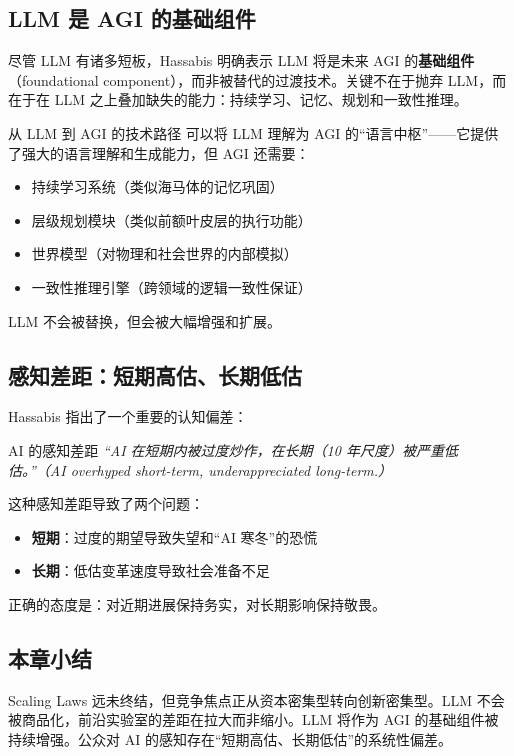 \subsection{LLM 是 AGI 的基础组件}

尽管 LLM 有诸多短板，Hassabis 明确表示 LLM 将是未来 AGI 的\textbf{基础组件}（foundational component），而非被替代的过渡技术。关键不在于抛弃 LLM，而在于在 LLM 之上叠加缺失的能力：持续学习、记忆、规划和一致性推理。

\begin{knowledgebox}{从 LLM 到 AGI 的技术路径}
可以将 LLM 理解为 AGI 的``语言中枢''——它提供了强大的语言理解和生成能力，但 AGI 还需要：
\begin{itemize}
    \item 持续学习系统（类似海马体的记忆巩固）
    \item 层级规划模块（类似前额叶皮层的执行功能）
    \item 世界模型（对物理和社会世界的内部模拟）
    \item 一致性推理引擎（跨领域的逻辑一致性保证）
\end{itemize}
LLM 不会被替换，但会被大幅增强和扩展。
\end{knowledgebox}

\subsection{感知差距：短期高估、长期低估}

Hassabis 指出了一个重要的认知偏差：

\begin{importantbox}{AI 的感知差距}
\textit{``AI 在短期内被过度炒作，在长期（10 年尺度）被严重低估。''（AI overhyped short-term, underappreciated long-term.）}

这种感知差距导致了两个问题：
\begin{itemize}
    \item \textbf{短期}：过度的期望导致失望和``AI 寒冬''的恐慌
    \item \textbf{长期}：低估变革速度导致社会准备不足
\end{itemize}
正确的态度是：对近期进展保持务实，对长期影响保持敬畏。
\end{importantbox}

\subsection{本章小结}

Scaling Laws 远未终结，但竞争焦点正从资本密集型转向创新密集型。LLM 不会被商品化，前沿实验室的差距在拉大而非缩小。LLM 将作为 AGI 的基础组件被持续增强。公众对 AI 的感知存在``短期高估、长期低估''的系统性偏差。

